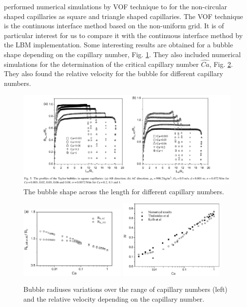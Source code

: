 \documentclass{article}
\begin{document}
\citet{wang-non-circular} performed numerical simulations by VOF technique to for the non-circular
shaped capillaries as square and triangle shaped capillaries. The VOF technique is the continuous
interface method based on the non-uniform grid. It is of particular interest for us to compare it
with the continuous interface method by the LBM implementation. Some interesting results are
obtained for a bubble
shape depending on the capillary number, Fig. \ref{fig:wang:bubble:shape}. They also included
numerical simulations for the determination of the critical capillary number $\hat{Ca}$, Fig.
\ref{fig:wang:critical:capillary}. They also found the relative velocity for the bubble for
different capillary numbers.
\begin{figure}
\includegraphics[width=\textwidth]{Figures/wang_bubble_shape.eps}
\caption{The bubble shape across the length for different capillary numbers.
\label{fig:wang:bubble:shape}}
\end{figure}
\begin{figure}
\includegraphics[width=0.47\textwidth]{Figures/wang_critical_capillary.eps}\hfill
\includegraphics[width=0.47\textwidth]{Figures/wang_relative_velocity.eps}
\caption{Bubble radiuses variations over the range of capillary numbers (left) and the relative
velocity depending on the capillary number.  \label{fig:wang:critical:capillary}}
\end{figure}
\end{document}

